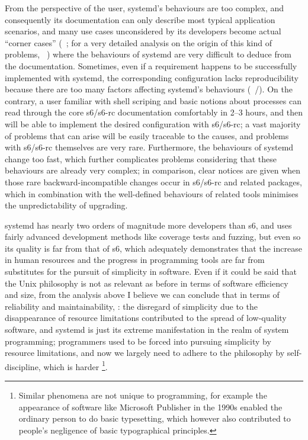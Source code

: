 From the perspective of the user, systemd's behaviours are too complex, and
consequently its documentation can only describe most typical application
scenarios, and many use cases unconsidered by its developers become actual
``corner cases'' (\eg~\parencite{dbiii2016}; for a very detailed analysis
on the origin of this kind of problems, \cf~\parencite{vr2015}) where the
behaviours of systemd are very difficult to deduce from the documentation.
Sometimes, even if a requirement happens to be successfully implemented
with systemd, the corresponding configuration lacks reproducibility because
there are too many factors affecting systemd's behaviours (\eg~\parencite%
{fitzcarraldo2018}/\parencite{zlogic2019}).  On the contrary, a user familiar
with shell scriping and basic notions about processes can read through the
core s6/s6-rc documentation comfortably in 2--3 hours, and then will be able
to implement the desired configuration with s6/s6-rc; a vast majority of
problems that can arise will be easily traceable to the causes, and problems
with s6/s6-rc themselves are very rare.  Furthermore,
the behaviours of systemd change too fast, which
further complicates problems considering that these behaviours are already
very complex; in comparison, clear notices are given when those rare
backward-incompatible changes occur in s6/s6-rc and related packages,
which in combination with the well-defined behaviours of related
tools minimises the unpredictability of upgrading.

systemd has nearly two orders of magnitude more developers than s6, and uses
fairly advanced development methods like coverage tests and fuzzing, but even
so its quality is far from that of s6, which adequately demonstrates that the
increase in human resources and the progress in programming tools are far from
substitutes for the pursuit of simplicity in software.  Even if it could be
said that the Unix philosophy is not as relevant as before in terms of software
efficiency and size, from the analysis above I believe we can conclude that in
terms of reliability and maintainability, : the disregard of
simplicity due to the disappearance of resource limitations contributed to the
spread of low-quality software, and systemd is just its extreme manifestation
in the realm of system programming; programmers used
to be forced into pursuing simplicity by resource limitations, and now we
largely need to adhere to the philosophy by self-discipline, which is harder%
\footnote{Similar phenomena are not unique to programming, for example
the appearance of software like Microsoft Publisher in the 1990s enabled
the ordinary person to do basic typesetting,
which however also contributed to people's negligence of
basic typographical principles.}.

